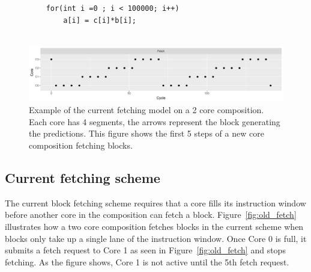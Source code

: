 

\begin{figure}[t]
\lstset{language=C,numbersep=4pt}
\begin{center}
\begin{lstlisting}
	for(int i =0 ; i < 100000; i++)
		a[i] = c[i]*b[i];
	
\end{lstlisting}
\end{center}
\vspace{-1em}
\label{lst:basic}
\end{figure}

\begin{figure}[t]
    \centering
    \includegraphics[width=1\textwidth]{chapter3/graphics/4fetchnorm.pdf}
    \caption{Example of the current fetching model on a 2 core composition. Each core has 4 segments, the arrows represent the block generating the predictions. This figure shows the first 5 steps of a new core composition fetching blocks.}
    \label{fig:fetch_norm}
\vspace{1em}
\end{figure}


\subsection{Current fetching scheme}
	
The current block fetching scheme requires that a core fills its instruction window before another core in the composition can fetch a block.
Figure~\ref{fig:old_fetch} illustrates how a two core composition fetches blocks in the current scheme when blocks only take up a single lane of the instruction window.
Once Core 0 is full, it submits a fetch request to Core 1 as seen in Figure~\ref{fig:old_fetch} and stops fetching.
As the figure shows, Core 1 is not active until the 5th fetch request.

